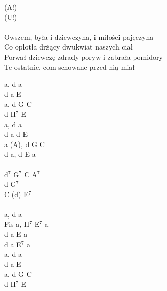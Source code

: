 \documentclass[a5paper, 10pt]{book}
\begin{document}
\begin{minipage}[t]{0.8\textwidth}
\hspace*{5mm}(A!) \\
\hspace*{5mm}(U!) \\
\\
Owszem, była i dziewczyna, i miłości pajęczyna\\
Co oplotła drżący dwukwiat naszych ciał\\
Porwał dziewczę zdrady poryw i zabrała pomidory\\
Te ostatnie, com schowane przed nią miał\\
\end{minipage}
\begin{minipage}[t]{0.2\textwidth}
a, d a\\
d a E\\
a, d G C\\
d H$^7$ E\\

a, d a\\
d a d E\\
a (A), d G C\\
d a, d E a\\
\\
d$^7$ G$^7$ C A$^7$\\
d G$^7$\\
C (d) E$^7$\\
\\
a, d a\\
Fis a, H$^7$ E$^7$ a\\
d a E a\\
d a E$^7$ a\\

a, d a\\
d a E\\
a, d G C\\
d H$^7$ E\\
\end{minipage}

\newpage
\end{document}
